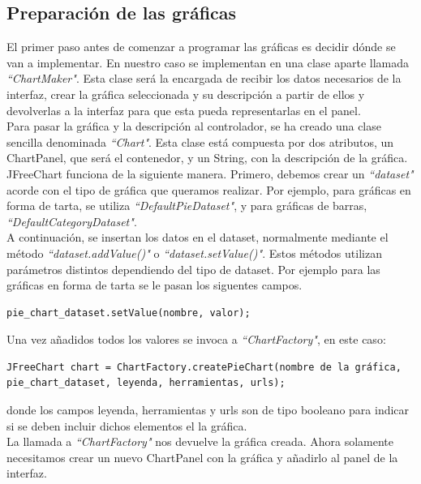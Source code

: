 \documentclass[12pt, a4paper]{book}
\begin{document}
\subsection{Preparación de las gráficas}

El primer paso antes de comenzar a programar las gráficas es decidir dónde se van a implementar. En nuestro caso se implementan en una clase aparte llamada \textit{``ChartMaker"}. Esta clase será la encargada de recibir los datos necesarios de la interfaz, crear la gráfica seleccionada y su descripción a partir de ellos y devolverlas a la interfaz para que esta pueda representarlas en el panel.\\

Para pasar la gráfica y la descripción al controlador, se ha creado una clase sencilla denominada \textit{``Chart"}. Esta clase está compuesta por dos atributos, un ChartPanel, que será el contenedor, y un String, con la descripción de la gráfica.\\

JFreeChart funciona de la siguiente manera. Primero, debemos crear un \textit{``dataset"} acorde con el tipo de gráfica que queramos realizar. Por ejemplo, para gráficas en forma de tarta, se utiliza \textit{``DefaultPieDataset"}, y para gráficas de barras, \textit{``DefaultCategoryDataset"}.\\

A continuación, se insertan los datos en el dataset, normalmente mediante el método \textit{``dataset.addValue()"} o \textit{``dataset.setValue()"}. Estos métodos utilizan parámetros distintos dependiendo del tipo de dataset. Por ejemplo para las gráficas en forma de tarta se le pasan los siguentes campos.

\begin{verbatim}
pie_chart_dataset.setValue(nombre, valor);
\end{verbatim}

Una vez añadidos todos los valores se invoca a \textit{``ChartFactory"}, en este caso: 

\begin{verbatim}
JFreeChart chart = ChartFactory.createPieChart(nombre de la gráfica,
pie_chart_dataset, leyenda, herramientas, urls);
\end{verbatim}
donde los campos leyenda, herramientas y urls son de tipo booleano para indicar si se deben incluir dichos elementos el la gráfica.\\

La llamada a \textit{``ChartFactory"} nos devuelve la gráfica creada. Ahora solamente necesitamos crear un nuevo ChartPanel con la gráfica y añadirlo al panel de la interfaz.
\end{document}
